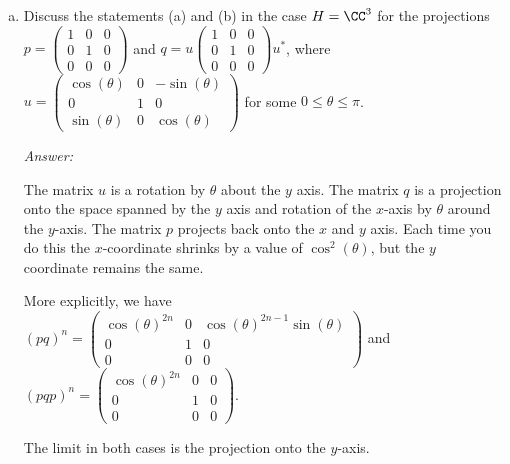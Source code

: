 \documentclass{article}
\begin{document}
\begin{enumerate}[(a)]
  \item Discuss the statements (a) and (b) in the case $H = \CC^3$ for the projections
    $p = \begin{pmatrix} 1 & 0 & 0 \\ 0 & 1 & 0 \\ 0 & 0 & 0   \end{pmatrix}$
    and $q = u  \begin{pmatrix} 1 & 0 & 0 \\ 0 & 1 & 0 \\ 0 & 0 & 0   \end{pmatrix} u^*$, where $u = \begin{pmatrix} \cos(\theta) & 0 & -\sin(\theta) \\    0 & 1 & 0 \\      \sin(\theta) & 0 & \cos(\theta)     \end{pmatrix}$ for some
    $0 \le \theta \le \pi$.

    \emph{Answer:}
    
    The matrix $u$ is a rotation by $\theta$ about the $y$ axis. The matrix $q$ is a projection onto the space spanned by the $y$ axis and rotation of the $x$-axis by $\theta$ around the $y$-axis.  The matrix $p$ projects back onto the $x$ and $y$ axis.  Each time you do this the $x$-coordinate shrinks by a value of $\cos^2(\theta)$, but the $y$ coordinate remains the same.

    More explicitly, we have
    $(pq)^n = \begin{pmatrix} \cos(\theta)^{2n} & 0 & \cos(\theta)^{2n-1} \sin(\theta) \\ 0 & 1 & 0 \\ 0 & 0 & 0     \end{pmatrix}$ and
    $(pqp)^n = \begin{pmatrix} \cos(\theta)^{2n} & 0 & 0 \\ 0 & 1 & 0 \\ 0 & 0 & 0     \end{pmatrix}$.

    The limit in both cases is the projection onto the $y$-axis.

  \end{enumerate}
    
\end{document}
